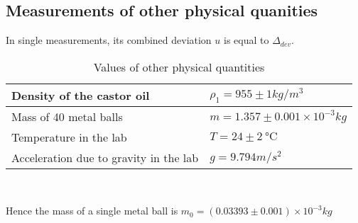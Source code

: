 \subsection{Measurements of other physical quanities}
    In single measurements, its combined deviation $u$ is equal to $\Delta_{dev}$.
    \begin{table}[htbp]
        \centering
        \begin{tabular}{ll}
            \hline\hline
            Density of the castor oil & $\rho_1=955\pm 1kg/m^3$\\
            \hline
            Mass of 40 metal balls & $m=1.357\pm 0.001\times10^{-3}kg$\\
            \hline      
            Temperature in the lab & $T=24\pm \SI{2}{\degreeCelsius}$\\
            \hline
            Acceleration due to gravity in the lab & $g=9.794m/s^2$\\        
            \hline\hline
        \end{tabular}\\
        \caption{Values of other physical quantities}
        \label{other}
    \end{table}

    Hence the mass of a single metal ball is $m_0=(0.03393\pm 0.001)\times10^{-3}kg$